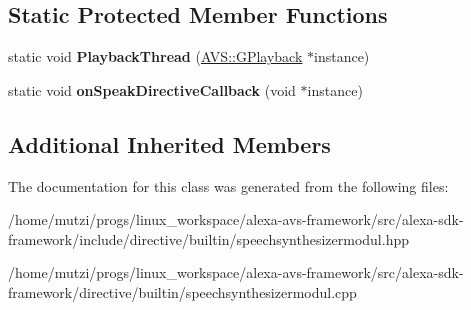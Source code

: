 \subsection*{Static Protected Member Functions}
\begin{DoxyCompactItemize}
\item 
\mbox{\label{classdirective_1_1SpeechSynthesizerModul_a6c78559a5382bfe555d3163243634c67}} 
static void {\bfseries Playback\+Thread} (\hyperlink{classAVS_1_1GPlayback}{A\+V\+S\+::\+G\+Playback} $\ast$instance)
\item 
\mbox{\label{classdirective_1_1SpeechSynthesizerModul_a3922a738c45d70865d3afe05febbef18}} 
static void {\bfseries on\+Speak\+Directive\+Callback} (void $\ast$instance)
\end{DoxyCompactItemize}
\subsection*{Additional Inherited Members}


The documentation for this class was generated from the following files\+:\begin{DoxyCompactItemize}
\item 
/home/mutzi/progs/linux\+\_\+workspace/alexa-\/avs-\/framework/src/alexa-\/sdk-\/framework/include/directive/builtin/speechsynthesizermodul.\+hpp\item 
/home/mutzi/progs/linux\+\_\+workspace/alexa-\/avs-\/framework/src/alexa-\/sdk-\/framework/directive/builtin/speechsynthesizermodul.\+cpp\end{DoxyCompactItemize}
